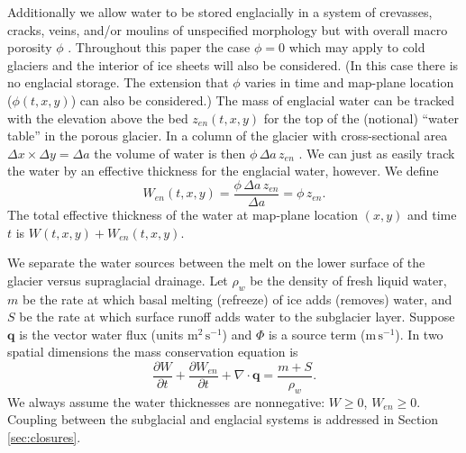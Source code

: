 \documentclass[11pt,final]{amsart}%
\newcommand\bq{\mathbf{q}}
\newcommand{\Div}{\nabla\cdot}
\begin{document}
Additionally we allow water to be stored englacially in a system of crevasses, cracks, veins, and/or moulins of unspecified morphology but with overall macro porosity $\phi$ \citep{Bartholomausetal2011}.  Throughout this paper the case $\phi=0$ which may apply to cold glaciers and the interior of ice sheets will also be considered.  (In this case there is no englacial storage.  The extension that $\phi$ varies in time and map-plane location ($\phi(t,x,y)$) can also be considered.)
The mass of englacial water can be tracked with the elevation above the bed $z_{en}(t,x,y)$ for the top of the (notional) ``water table'' in the porous glacier.  In a column of the glacier with cross-sectional area $\Delta x \times \Delta y = \Delta a$ the volume of water is then $\phi\, \Delta a \, z_{en}$ \citep{Bartholomausetal2011}.  We can just as easily track the water by an effective thickness for the englacial water, however.  We define
\begin{equation}
W_{en}(t,x,y) = \frac{\phi\, \Delta a\, z_{en}}{\Delta a} = \phi\, z_{en}. \label{eq:definezen}
\end{equation}
The total effective thickness of the water at map-plane location $(x,y)$ and time $t$ is $W(t,x,y)+W_{en}(t,x,y)$.

We separate the water sources between the melt on the lower surface of the glacier versus supraglacial drainage.  Let $\rho_w$ be the density of fresh liquid water, $m$ be the rate at which basal melting (refreeze) of ice adds (removes) water, and $S$ be the rate at which surface runoff adds water to the subglacier layer.  Suppose $\bq$ is the vector water flux (units $\text{m}^2\,\text{s}^{-1}$) and $\Phi$ is a source term ($\text{m}\,\text{s}^{-1}$).  In two spatial dimensions the mass conservation equation is \citep{Clarke05}
\begin{equation} \label{eq:conserve}
\frac{\partial W}{\partial t} + \frac{\partial W_{en}}{\partial t} + \Div \bq = \frac{m+S}{\rho_w}.
\end{equation}
We always assume the water thicknesses are nonnegative: $W \ge 0$, $W_{en} \ge 0$.  Coupling between the subglacial and englacial systems is addressed in Section \ref{sec:closures}.
\end{document}
